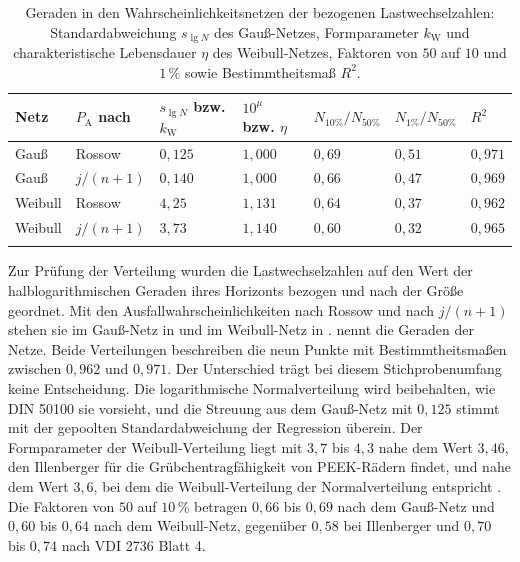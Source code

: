 \begin{table}[htbp]
	\caption{Geraden in den Wahrscheinlichkeitsnetzen der bezogenen Lastwechselzahlen: Standardabweichung $s_{\lg N}$ des Gauß-Netzes, Formparameter $k_{\mathrm{W}}$ und charakteristische Lebensdauer $\eta$ des Weibull-Netzes, Faktoren von $50$ auf $10$ und $1$\,\% sowie Bestimmtheitsmaß $R^{2}$.}
	\label{tab:woehler_netze}
	\centering
	\footnotesize
	\setlength{\tabcolsep}{4pt}
	\begin{tabular}{L{1.6cm}L{2.4cm}L{2.5cm}L{2.1cm}L{1.9cm}L{1.9cm}L{1.4cm}}
		Netz    & $P_{\mathrm{A}}$ nach & $s_{\lg N}$ bzw. $k_{\mathrm{W}}$ & $10^{\mu}$ bzw. $\eta$ & $N_{10\%}/N_{50\%}$ & $N_{1\%}/N_{50\%}$ & $R^{2}$   \\
		\hline
		Gauß    & Rossow                & $0{,}125$                         & $1{,}000$              & $0{,}69$            & $0{,}51$           & $0{,}971$ \\
		\hline
		Gauß    & $j/(n+1)$             & $0{,}140$                         & $1{,}000$              & $0{,}66$            & $0{,}47$           & $0{,}969$ \\
		\hline
		Weibull & Rossow                & $4{,}25$                          & $1{,}131$              & $0{,}64$            & $0{,}37$           & $0{,}962$ \\
		\hline
		Weibull & $j/(n+1)$             & $3{,}73$                          & $1{,}140$              & $0{,}60$            & $0{,}32$           & $0{,}965$ \\
		\hline
	\end{tabular}
\end{table}

Zur Prüfung der Verteilung wurden die Lastwechselzahlen auf den Wert der halblogarithmischen Geraden ihres Horizonts bezogen und nach der Größe geordnet. Mit den Ausfallwahrscheinlichkeiten nach Rossow und nach $j/(n+1)$ stehen sie im Gauß-Netz in  und im Weibull-Netz in .  nennt die Geraden der Netze. Beide Verteilungen beschreiben die neun Punkte mit Bestimmtheitsmaßen zwischen $0{,}962$ und $0{,}971$. Der Unterschied trägt bei diesem Stichprobenumfang keine Entscheidung. Die logarithmische Normalverteilung wird beibehalten, wie DIN 50100 sie vorsieht, und die Streuung aus dem Gauß-Netz mit $0{,}125$ stimmt mit der gepoolten Standardabweichung der Regression überein. Der Formparameter der Weibull-Verteilung liegt mit $3{,}7$ bis $4{,}3$ nahe dem Wert $3{,}46$, den Illenberger für die Grübchentragfähigkeit von PEEK-Rädern findet, und nahe dem Wert $3{,}6$, bei dem die Weibull-Verteilung der Normalverteilung entspricht \cite[S.~96 bis 97]{Ill22}. Die Faktoren von $50$ auf $10$\,\% betragen $0{,}66$ bis $0{,}69$ nach dem Gauß-Netz und $0{,}60$ bis $0{,}64$ nach dem Weibull-Netz, gegenüber $0{,}58$ bei Illenberger und $0{,}70$ bis $0{,}74$ nach VDI 2736 Blatt 4.

